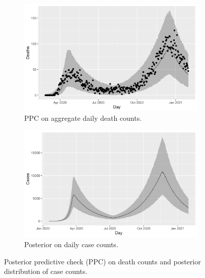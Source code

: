 \documentclass[11pt]{amsart}
\numberwithin{equation}{section}
\theoremstyle{plain}
\begin{document}
  \begin{figure}
 \centering
 \begin{subfigure}{.5\textwidth}
  \centering
  \includegraphics[width=.9\linewidth]{../figs/deaths_ppc.png}
 \caption{PPC on aggregate daily death counts.}
 \label{fig:deathsppc}
 \end{subfigure}%
 \begin{subfigure}{.5\textwidth}
  \centering
  \includegraphics[width=.9\linewidth]{../figs/cases_ppc.png}
 \caption{Posterior on daily case counts.}
 \label{fig:casesppc}
 \end{subfigure}
 \caption{Posterior predictive check (PPC) on death counts and posterior distribution of case counts.}
 \label{fig:ppcs}
 \end{figure}
\end{document}
